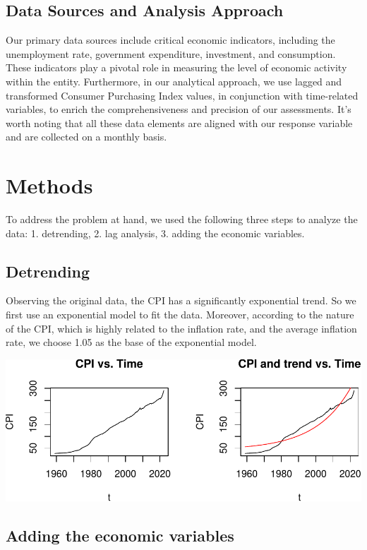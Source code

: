 \documentclass[
  man,floatsintext,
  man]{apa6}
\begin{document}
\subsection{Data Sources and Analysis Approach}\label{data-sources-and-analysis-approach}

Our primary data sources include critical economic indicators, including the unemployment rate, government expenditure, investment, and consumption. These indicators play a pivotal role in measuring the level of economic activity within the entity. Furthermore, in our analytical approach, we use lagged and transformed Consumer Purchasing Index values, in conjunction with time-related variables, to enrich the comprehensiveness and precision of our assessments. It's worth noting that all these data elements are aligned with our response variable and are collected on a monthly basis.

\section{Methods}\label{methods}

To address the problem at hand, we used the following three steps to analyze the data: 1. detrending, 2. lag analysis, 3. adding the economic variables.

\subsection{Detrending}\label{detrending}

Observing the original data, the CPI has a significantly exponential trend. So we first use an exponential model to fit the data.
Moreover, according to the nature of the CPI, which is highly related to the inflation rate, and the average inflation rate, we choose 1.05 as the base of the exponential model.

\includegraphics{stat429_group2_final_proj_files/figure-latex/unnamed-chunk-1-1.pdf}

\subsection{Adding the economic variables}\label{adding-the-economic-variables}
\end{document}

